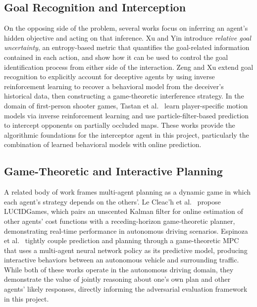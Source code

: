 \documentclass[letterpaper, 10pt, conference]{ieeeconf}
\begin{document}
\subsection{Goal Recognition and Interception} \label{sec:related-work/goal-recognition-and-interception}

On the opposing side of the problem, several works focus on inferring an agent's hidden objective and acting on that inference. Xu and Yin \cite{xu2019goal} introduce \emph{relative goal uncertainty}, an entropy-based metric that quantifies the goal-related information contained in each action, and show how it can be used to control the goal identification process from either side of the interaction. Zeng and Xu \cite{zeng2023recognition} extend goal recognition to explicitly account for deceptive agents by using inverse reinforcement learning to recover a behavioral model from the deceiver's historical data, then constructing a game-theoretic interference strategy. In the domain of first-person shooter games, Tastan et al.\ \cite{tastan2012learning} learn player-specific motion models via inverse reinforcement learning and use particle-filter-based prediction to intercept opponents on partially occluded maps. These works provide the algorithmic foundations for the interceptor agent in this project, particularly the combination of learned behavioral models with online prediction.

\subsection{Game-Theoretic and Interactive Planning} \label{sec:related-work/game-theoretic-and-interactive-planning}

A related body of work frames multi-agent planning as a dynamic game in which each agent's strategy depends on the others'. Le Cleac'h et al.\ \cite{lecleach2021lucidgames} propose LUCIDGames, which pairs an unscented Kalman filter for online estimation of other agents' cost functions with a receding-horizon game-theoretic planner, demonstrating real-time performance in autonomous driving scenarios. Espinoza et al.\ \cite{espinoza2022deep} tightly couple prediction and planning through a game-theoretic MPC that uses a multi-agent neural network policy as its predictive model, producing interactive behaviors between an autonomous vehicle and surrounding traffic. While both of these works operate in the autonomous driving domain, they demonstrate the value of jointly reasoning about one's own plan and other agents' likely responses, directly informing the adversarial evaluation framework in this project.
\end{document}
